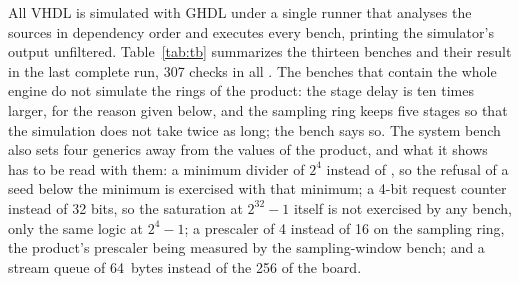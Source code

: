 All VHDL is simulated with GHDL under a single runner that analyses the
sources in dependency order and executes every bench, printing the
simulator's output unfiltered. Table~\ref{tab:tb} summarizes the thirteen
benches and their result in the last complete run, 307 checks in all
\simu{}. The benches that contain the whole engine do not simulate the
rings of the product: the stage delay is ten times larger, for the reason
given below, and the sampling ring keeps five stages so that the
simulation does not take twice as long; the bench says so. The system
bench also sets four generics away from the values of the product, and
what it shows has to be read with them: a minimum divider of $2^{4}$
instead of , so the refusal of a seed below the minimum is
exercised with that minimum; a 4-bit request counter instead of 32 bits,
so the saturation at $2^{32}-1$ itself is not exercised by any bench,
only the same logic at $2^{4}-1$; a prescaler of 4 instead of 16 on the
sampling ring, the product's prescaler being measured by the
sampling-window bench; and a stream queue of 64~bytes instead of the 256
of the board.


